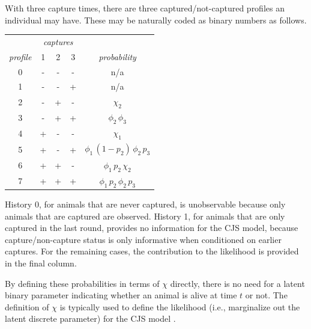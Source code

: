 With three capture times, there are three captured/not-captured
profiles an individual may have.  These may be naturally coded as
binary numbers as follows.
%
\begin{center}
\begin{tabular}{c|ccc|c}
& \multicolumn{3}{|c|}{{\it captures}}
\\
{\it profile} & 1 & 2 & 3 & {\it probability}
\\ \hline
{0} & - & - & - & n/a
\\
{1} & - & - & + & n/a
\\ \hline
{2} & - & + & - & $\chi_2$
\\
{3} & - & + & + & $\phi_2 \, \phi_3$
\\ \hline
{4} & + & - & - & $\chi_1$
\\
{5} & + & - & + & $\phi_1 \, (1 - p_2) \, \phi_2 \, p_3$
\\ \hline
{6} & + & + & - & $ \phi_1 \, p_2 \, \chi_2$
\\ 
{7} & + & + & + & $\phi_1 \, p_2 \, \phi_2 \, p_3$
\end{tabular}
\end{center}
%
History 0, for animals that are never captured, is unobservable
because only animals that are captured are observed. History 1, for
animals that are only captured in the last round, provides no
information for the CJS model, because capture/non-capture status is
only informative when conditioned on earlier captures.  For the
remaining cases, the contribution to the likelihood is provided in the
final column.

By defining these probabilities in terms of $\chi$ directly, there is
no need for a latent binary parameter indicating whether an animal is
alive at time $t$ or not.  The definition of $\chi$ is typically used
to define the likelihood (i.e., marginalize out the latent discrete
parameter) for the CJS model \citep[page 9]{Schofield:2007}.

